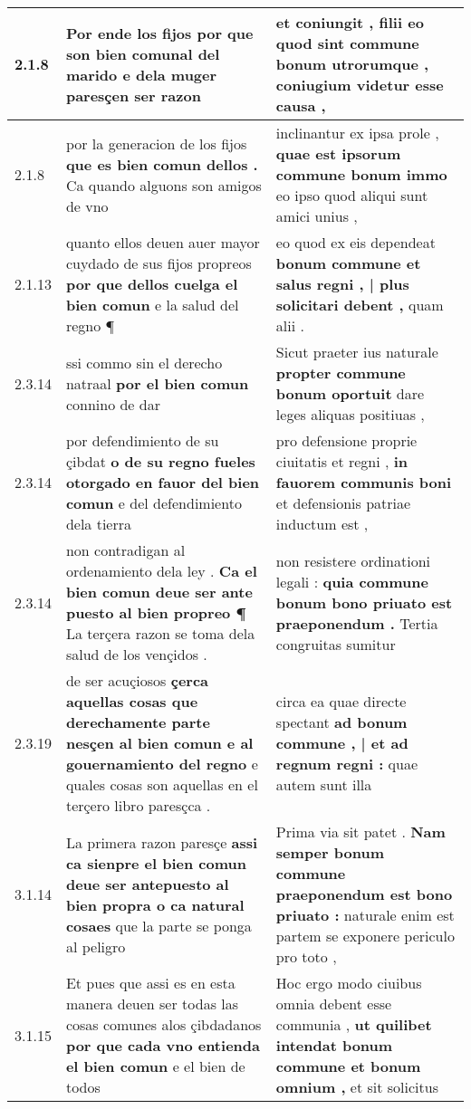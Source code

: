 \begin{tabular}{|p{1cm}|p{6.5cm}|p{6.5cm}|}
2.1.8 & Por ende los fijos \textbf{ por que son bien comunal del marido } e dela muger paresçen ser razon & et coniungit , \textbf{ filii eo quod sint commune bonum utrorumque , } coniugium videtur esse causa , \\\hline
2.1.8 & por la generacion de los fijos \textbf{ que es bien comun dellos . } Ca quando alguons son amigos de vno & inclinantur ex ipsa prole , \textbf{ quae est ipsorum commune bonum immo } eo ipso quod aliqui sunt amici unius , \\\hline
2.1.13 & quanto ellos deuen auer mayor cuydado de sus fijos propreos \textbf{ por que dellos cuelga el bien comun } e la salud del regno ¶ & eo quod ex eis dependeat \textbf{ bonum commune et salus regni , | plus solicitari debent , } quam alii . \\\hline
2.3.14 & ssi commo sin el derecho natraal \textbf{ por el bien comun } connino de dar & Sicut praeter ius naturale \textbf{ propter commune bonum oportuit } dare leges aliquas positiuas , \\\hline
2.3.14 & por defendimiento de su çibdat \textbf{ o de su regno fueles otorgado en fauor del bien comun } e del defendimiento dela tierra & pro defensione proprie ciuitatis et regni , \textbf{ in fauorem communis boni } et defensionis patriae inductum est , \\\hline
2.3.14 & non contradigan al ordenamiento dela ley . \textbf{ Ca el bien comun deue ser ante puesto al bien propreo ¶ } La terçera razon se toma dela salud de los vençidos . & non resistere ordinationi legali : \textbf{ quia commune bonum bono priuato est praeponendum . } Tertia congruitas sumitur \\\hline
2.3.19 & de ser acuçiosos \textbf{ çerca aquellas cosas que derechamente parte nesçen al bien comun e al gouernamiento del regno } e quales cosas son aquellas en el terçero libro paresçca . & circa ea quae directe spectant \textbf{ ad bonum commune , | et ad regnum regni : } quae autem sunt illa \\\hline
3.1.14 & La primera razon paresçe \textbf{ assi ca sienpre el bien comun deue ser antepuesto al bien propra o ca natural cosaes } que la parte se ponga al peligro & Prima via sit patet . \textbf{ Nam semper bonum commune praeponendum est bono priuato : } naturale enim est partem se exponere periculo pro toto , \\\hline
3.1.15 & Et pues que assi es en esta manera deuen ser todas las cosas comunes alos çibdadanos \textbf{ por que cada vno entienda el bien comun } e el bien de todos & Hoc ergo modo ciuibus omnia debent esse communia , \textbf{ ut quilibet intendat bonum commune et bonum omnium , } et sit solicitus \\\hline

\end{tabular}
